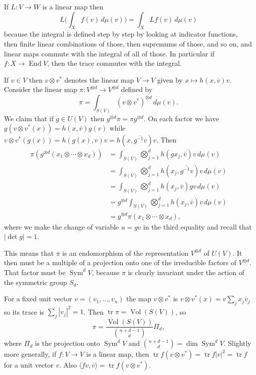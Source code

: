 \documentclass[11pt]{article}
\theoremstyle{definition}
\def\ov#1{\overline{#1}}
\DeclareMathOperator{\Vol}{Vol}
\DeclareMathOperator{\End}{End}
\DeclareMathOperator{\Sym}{Sym}
\DeclareMathOperator{\tr}{tr}
\begin{document}
If $L : V \to W$ is a linear map then
$$
L \biggl( \int_X f(v) \, d\mu(v) \biggr)
= \int_X L f(v) \, d\mu(v)
$$
because the integral is defined step by step by looking at indicator functions,
then finite linear combinations of those, then supremums of those, and so on,
and linear maps commute with the integral of all of those.
In particular if $f : X \to \End V$, then the trace commutes with the integral.

If $v \in V$ then $v \otimes v^*$ denotes the linear map $V \to V$ given by $x
\mapsto h(x, \ov v) v$.
Consider the linear map $\pi : V^{\otimes d} \to V^{\otimes d}$ defined by
$$
\pi = \int_{S(V)} (v \otimes v^*)^{\otimes d} \, d\mu(v).
$$
We claim that if $g \in U(V)$ then $g^{\otimes d} \pi = \pi g^{\otimes d}$.
On each factor we have $g(v\otimes v^*(x)) = h(x,\ov v) g(v)$
while $v \otimes v^*(g(x)) = h(g(x), \ov v) v = h(x, \ov{g^{-1}v}) v$.
Then
\begin{align*}
\pi(g^{\otimes d}(x_1 \otimes \cdots \otimes x_d))
&= \int_{S(V)} \bigotimes_{j=1}^d h(g x_j, \ov v) v \, d\mu(v)
\\
&= \int_{S(V)} \bigotimes_{j=1}^d h(x_j, \ov{g^{-1}v}) v \, d\mu(v)
\\
&= \int_{S(V)} \bigotimes_{j=1}^d h(x_j, \ov{v}) g v \, d\mu(v)
\\
&= g^{\otimes d} \int_{S(V)} \bigotimes_{j=1}^d h(x_j, \ov{v}) v \, d\mu(v)
\\
&= g^{\otimes d} \pi(x_1 \otimes \cdots \otimes x_d),
\end{align*}
where we make the change of variable $u = gv$ in the third equality and recall
that $|\!\det g| = 1$.

This means that $\pi$ is an endomorphism of the representation $V^{\otimes d}$
of $U(V)$.
It then must be a multiple of a projection onto one of the irreducible factors
of $V^{\otimes d}$.
That factor must be $\Sym^d V$, because $\pi$ is clearly invariant under the
action of the symmetric group $S_d$.

For a fixed unit vector $v = (v_1,\ldots,v_n)$ the map $v \otimes v^*$
is $v \otimes v^*(x) = v \sum_j x_j \ov v_j$ so its trace is $\sum_j |v_j|^2 = 1$.
Then $\tr \pi = \Vol(S(V))$, so
$$
\pi = \frac{\Vol(S(V))}{\binom{n+d-1}{d}} \Pi_d,
$$
where $\Pi_d$ is the projection onto $\Sym^d V$ and $\binom{n+d-1}{d} = \dim
\Sym^d V$.
Slightly more generally, if $f : V \to V$ is a linear map, then
$\tr f (v \otimes v^*) = \tr f |v|^2 = \tr f$ for a unit vector $v$.
Also
$\langle f v, \ov v \rangle = \tr f (v \otimes v^*)$.
\end{document}
